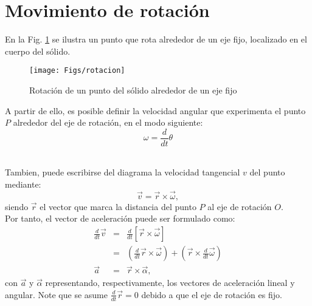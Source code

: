 \section*{Movimiento de rotación}
En la Fig. \ref{rotacion} se ilustra un punto que rota alrededor de un eje fijo, localizado en el cuerpo del sólido.\\
\begin{figure}[h]
\centering
\caption[]{Rotación de un punto del sólido alrededor de un eje fijo}\label{rotacion}
\texttt{[image: Figs/rotacion]}
\end{figure}

\noindent A partir de ello, es posible definir la velocidad angular que experimenta el punto $P$ alrededor del eje de rotación, en el modo siguiente:
\begin{equation}
\omega = \frac{d}{dt}\theta
\end{equation}\

\noindent Tambien, puede escribirse del diagrama la velocidad tangencial $v$ del punto mediante:
\begin{equation}
\vec{v} = \vec{r} \times \vec{\omega},
\end{equation}
siendo $\vec{r}$ el vector que marca la distancia del punto $P$ al eje de rotación $O$.\\

\noindent Por tanto, el vector de aceleración puede ser formulado como:
\begin{eqnarray}\label{aceler}
\nonumber \frac{d}{dt}\vec{v} & = & \frac{d}{dt}[\vec{r} \times \vec{\omega}]\\
\nonumber & = & \left( \frac{d}{dt}\vec{r}\times \vec{\omega}\right) + \left( \vec{r}\times \frac{d}{dt}\vec{\omega}\right)\\
\vec{a}   & = & \vec{r} \times \vec{\alpha},
\end{eqnarray}
con $\vec{a}$ y $\vec{\alpha}$ representando, respectivamente, los vectores de aceleración lineal y angular. Note que se asume $\frac{d}{dt}\vec{r} = 0$ debido a que el eje de rotación es fijo.

